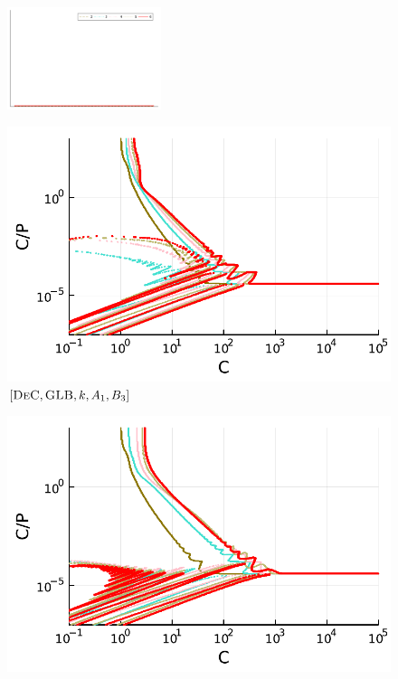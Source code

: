 \begin{figure}
	\centering
	\includegraphics[width=0.4\textwidth,trim={230 340 30 22}, clip]{pdf/pdepics/legends/colors_a-d_new_horiz_2-6_no_order.pdf}\\
	\begin{minipage}[t]{0.32\textwidth}
		\centering
		\includegraphics[width=\textwidth]{pdf/pdepics/disp/IMEXDeC_gaussLobatto_disp_TMM_2-6_newE.pdf}
		\small$[\textsc{DeC}, \textsc{GLB},k, A_1,B_3]$\par
	\end{minipage}
	\begin{minipage}[t]{0.32\textwidth}
		\centering
		\includegraphics[width=\textwidth]{pdf/pdepics/disp/IMEXDeC_subtimesteps_gaussLobatto_disp_TMM_2-6_newE.pdf}

\end{minipage}
\end{figure}
